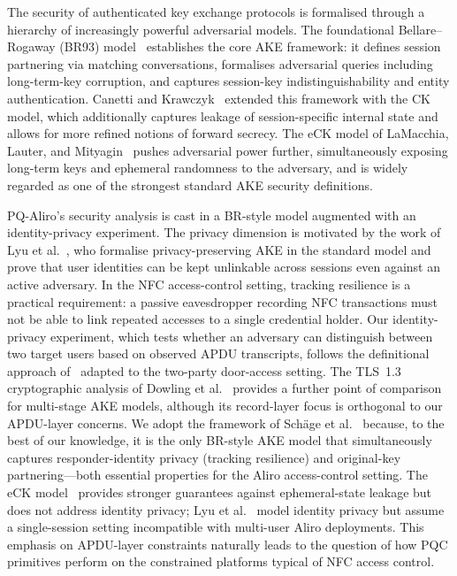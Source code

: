 \documentclass[runningheads]{llncs}
\begin{document}
The security of authenticated key exchange protocols is formalised through a
hierarchy of increasingly powerful adversarial models.
The foundational Bellare--Rogaway (BR93) model~\cite{C:BelRog93} establishes
the core AKE framework: it defines session partnering via matching
conversations, formalises adversarial queries including long-term-key
corruption, and captures session-key indistinguishability and entity
authentication.
Canetti and Krawczyk~\cite{EC:CanKra01} extended this framework with the CK
model, which additionally captures leakage of session-specific internal state
and allows for more refined notions of forward secrecy.
The eCK model of LaMacchia, Lauter, and Mityagin~\cite{PROVSEC:LaMLauMit07}
pushes adversarial power further, simultaneously exposing long-term keys and
ephemeral randomness to the adversary, and is widely regarded as one of the
strongest standard AKE security definitions.

PQ-Aliro's security analysis is cast in a BR-style model augmented with an
identity-privacy experiment.
The privacy dimension is motivated by the work of Lyu et al.~\cite{AC:LLHG22},
who formalise privacy-preserving AKE in the standard model and prove that user
identities can be kept unlinkable across sessions even against an active
adversary.
In the NFC access-control setting, tracking resilience is a practical
requirement: a passive eavesdropper recording NFC transactions must not be able
to link repeated accesses to a single credential holder.
Our identity-privacy experiment, which tests whether an adversary can
distinguish between two target users based on observed APDU transcripts,
follows the definitional approach of~\cite{AC:LLHG22} adapted to the two-party
door-access setting.
The TLS~1.3 cryptographic analysis of Dowling et al.~\cite{JC:DFGS21} provides
a further point of comparison for multi-stage AKE models, although its
record-layer focus is orthogonal to our APDU-layer concerns.
We adopt the framework of Sch{\"a}ge et al.~\cite{PKC:SchSchLau20} because, to the best of our knowledge, it is the only BR-style AKE model that simultaneously captures responder-identity privacy (tracking resilience) and original-key partnering---both essential properties for the Aliro access-control setting.
The eCK model~\cite{PROVSEC:LaMLauMit07} provides stronger guarantees against ephemeral-state leakage but does not address identity privacy; Lyu et al.~\cite{AC:LLHG22} model identity privacy but assume a single-session setting incompatible with multi-user Aliro deployments.
This emphasis on APDU-layer constraints naturally leads to the question of how
PQC primitives perform on the constrained platforms typical of NFC access
control.
\end{document}
